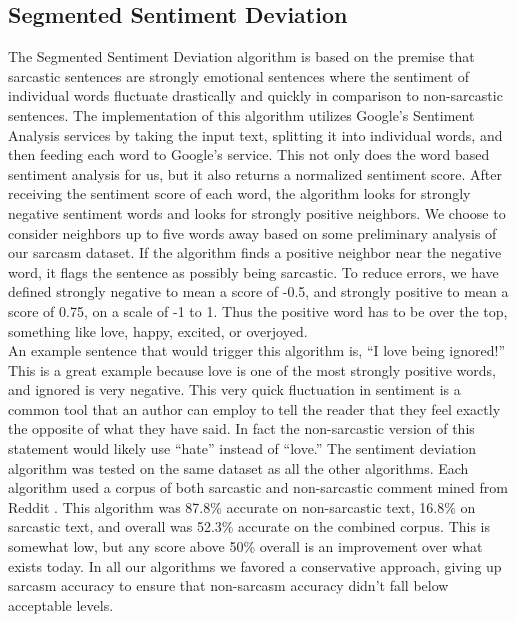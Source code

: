 \documentclass[conference]{IEEEtran}
\begin{document}
\subsection{Segmented Sentiment Deviation}
The Segmented Sentiment Deviation algorithm is based on the premise that sarcastic sentences are strongly emotional sentences where the sentiment of individual words fluctuate drastically and quickly in comparison to non-sarcastic sentences. The implementation of this algorithm utilizes Google’s Sentiment Analysis services by taking the input text, splitting it into individual words, and then feeding each word to Google’s service. This not only does the word based sentiment analysis for us, but it also returns a normalized sentiment score. After receiving the sentiment score of each word, the algorithm looks for strongly negative sentiment words and looks for strongly positive neighbors. We choose to consider neighbors up to five words away based on some preliminary analysis of our sarcasm dataset. If the algorithm finds a positive neighbor near the negative word, it flags the sentence as possibly being sarcastic. To reduce errors, we have defined strongly negative to mean a score of -0.5, and strongly positive to mean a score of 0.75, on a scale of -1 to 1. Thus the positive word has to be over the top, something like love, happy, excited, or overjoyed. \\
An example sentence that would trigger this algorithm is, “I love being ignored!” This is a great example because love is one of the most strongly positive words, and ignored is very negative. This very quick fluctuation in sentiment is a common tool that an author can employ to tell the reader that they feel exactly the opposite of what they have said. In fact the non-sarcastic version of this statement would likely use “hate” instead of “love.”  The sentiment deviation algorithm was tested on the same dataset as all the other algorithms. Each algorithm used a corpus of both sarcastic and non-sarcastic comment mined from Reddit \cite{b5}. This algorithm was 87.8\% accurate on non-sarcastic text, 16.8\% on sarcastic text, and overall was 52.3\% accurate on the combined corpus. This is somewhat low, but any score above 50\% overall is an improvement over what exists today. In all our algorithms we favored a conservative approach, giving up sarcasm accuracy to ensure that non-sarcasm accuracy didn’t fall below acceptable levels. \\
\end{document}
